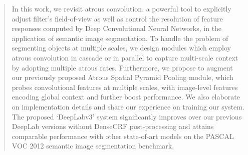 \begin{abstract}
  In this work, we revisit atrous convolution, a powerful tool to explicitly adjust filter's field-of-view
  as well as control the resolution of feature responses computed by Deep Convolutional Neural Networks,
  in the application of semantic image segmentation. To handle the problem of segmenting
  objects at multiple scales, we design modules which employ atrous convolution in
  cascade or in parallel to capture multi-scale context by adopting multiple atrous rates.
  Furthermore, we propose to augment our previously proposed Atrous Spatial Pyramid Pooling module, which probes
  convolutional features at multiple scales, with image-level features
  encoding global context and further boost performance. We also elaborate on implementation details and
  share our experience on training our system. The proposed `DeepLabv3' system significantly
  improves over our previous DeepLab versions without DenseCRF post-processing and attains comparable performance with
  other state-of-art models on the PASCAL VOC 2012 semantic image segmentation benchmark.
\end{abstract}
